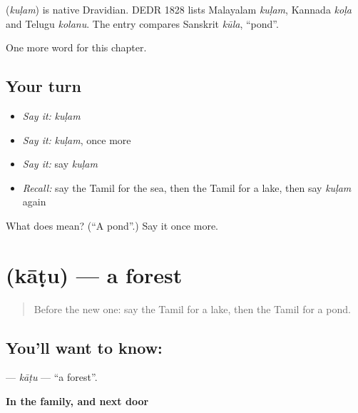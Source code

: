 \begin{cousinweb}
\textbf{} (\emph{kuḷam}) is native Dravidian. DEDR 1828 lists Malayalam \emph{kuḷam}, Kannada \emph{koḷa} and Telugu \emph{kolanu}. The entry compares Sanskrit \emph{kūla}, \textquotedblleft{}pond\textquotedblright{}.
\end{cousinweb}

\begin{grammarlens}[title={What you've built}]
One more word for this chapter.
\end{grammarlens}

\subsection*{Your turn}
\begin{itemize}
\raggedright
  \item \emph{Say it:} \emph{kuḷam}
  \item \emph{Say it:} \emph{kuḷam}, once more
  \item \emph{Say it:} say \emph{kuḷam}
  \item \emph{Recall:} say the Tamil for the sea, then the Tamil for a lake, then say \emph{kuḷam} again
\end{itemize}

\begin{tcolorbox}[breakable,colback=teal!4,colframe=teal!35!black,title={Before you move on}]
What does  mean? (\textquotedblleft{}A pond\textquotedblright{}.) Say it once more.
\end{tcolorbox}
\section[\texorpdfstring{\ta{காடு} (kāṭu)}{காடு (kāṭu)}]{ (kāṭu) — a forest}

\label{lesson:TA-C126-katu}



\begin{quote}
Before the new one: say the Tamil for a lake, then the Tamil for a pond.
\end{quote}

\subsection*{You'll want to know: }
\textbf{} — \emph{kāṭu} — \textquotedblleft{}a forest\textquotedblright{}.

\textbf{In the family, and next door}

